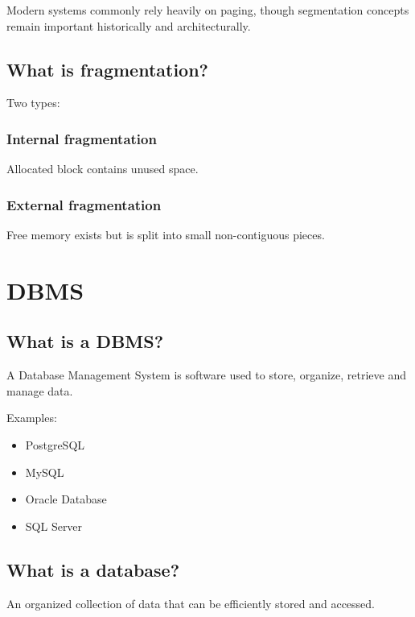 Modern systems commonly rely heavily on paging, though segmentation concepts remain important historically and architecturally.

\medskip

\subsection{What is fragmentation?}

Two types:

\subsubsection{Internal fragmentation}

Allocated block contains unused space.

\subsubsection{External fragmentation}

Free memory exists but is split into small non-contiguous pieces.

\medskip

\section{DBMS}

\subsection{What is a DBMS?}

A Database Management System is software used to store, organize, retrieve and manage data.

Examples:

\begin{itemize}
  \item PostgreSQL
  \item MySQL
  \item Oracle Database
  \item SQL Server
\end{itemize}

\medskip

\subsection{What is a database?}

An organized collection of data that can be efficiently stored and accessed.

